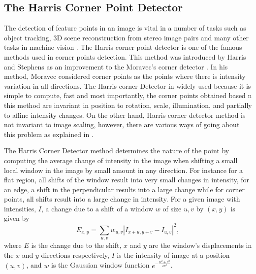 \documentclass[10pt,a4paper]{article}
\begin{document}
      \subsection{The Harris Corner Point Detector}
      The detection of feature points in an image is vital in a number of tasks such as object tracking, $3$D scene reconstruction from stereo image pairs and many other tasks in machine vision \citep{trajkovic1998fast}.
      The Harris corner point detector is one of the famous methods used in corner points detection. This method was introduced by Harris and Stephens \citep{harris1988combined} as an improvement to the Moravec's corner detector \citep{moravec1979visual,moravec1980obstacle}. In his method, Moravec considered corner points as the points where there is intensity variation in all directions. The Harris corner Detector in widely used because it is simple to compute, fast and most importantly, the corner points obtained based n this method are invariant in position to rotation, scale, illumination, and partially to affine intensity changes. On the other hand, Harris corner detector method is not invariant to image scaling, however, there are various ways of going about this problem as explained in \citep{stoica2011delaunay}.
  
      The Harris Corner Detector method determines the nature of the point by computing the average change of intensity in the image when shifting a small local window in the image by small amount in any direction. For instance for a flat region, all shifts of the window result into very small changes in intensity, for an edge, a shift in the perpendicular results into a large change while for corner points, all shifts result into a large change in intensity. For a given image with intensities, $I$, a change due to a shift of a window $w$ of size $u,v$ by $(x,y)$ is given by
      \begin{equation}
      E_{x,y} = \sum_{u,v} w_{u,v} |I_{x+u, y+v} - I_{u,v}|^2,
      \end{equation}
      where $E$ is the change due to the shift, $x$ and $y$ are the window's displacements in the $x$ and $y$ directions respectively, $I$ is the intensity of image at a position $(u,v)$, and $w$ is the Gaussian window function  $e^{-\frac{u^2 + v^2}{2 \sigma^2}}$.
      
\end{document}
